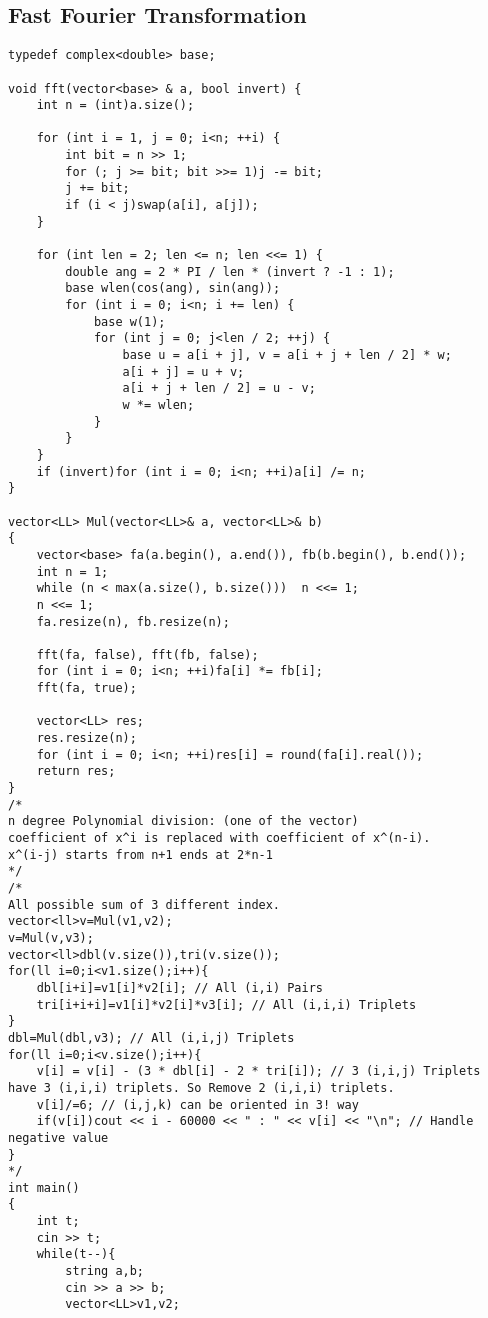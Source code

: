 \documentclass[10pt,a4paper,onesided]{article}
\begin{document}
\begin{multicols*}{3}
\subsection{Fast Fourier Transformation}
\begin{lstlisting}
typedef complex<double> base;

void fft(vector<base> & a, bool invert) {
    int n = (int)a.size();

    for (int i = 1, j = 0; i<n; ++i) {
        int bit = n >> 1;
        for (; j >= bit; bit >>= 1)j -= bit;
        j += bit;
        if (i < j)swap(a[i], a[j]);
    }

    for (int len = 2; len <= n; len <<= 1) {
        double ang = 2 * PI / len * (invert ? -1 : 1);
        base wlen(cos(ang), sin(ang));
        for (int i = 0; i<n; i += len) {
            base w(1);
            for (int j = 0; j<len / 2; ++j) {
                base u = a[i + j], v = a[i + j + len / 2] * w;
                a[i + j] = u + v;
                a[i + j + len / 2] = u - v;
                w *= wlen;
            }
        }
    }
    if (invert)for (int i = 0; i<n; ++i)a[i] /= n;
}

vector<LL> Mul(vector<LL>& a, vector<LL>& b)
{
    vector<base> fa(a.begin(), a.end()), fb(b.begin(), b.end());
    int n = 1;
    while (n < max(a.size(), b.size()))  n <<= 1;
    n <<= 1;
    fa.resize(n), fb.resize(n);

    fft(fa, false), fft(fb, false);
    for (int i = 0; i<n; ++i)fa[i] *= fb[i];
    fft(fa, true);

    vector<LL> res;
    res.resize(n);
    for (int i = 0; i<n; ++i)res[i] = round(fa[i].real());
    return res;
}
/*
n degree Polynomial division: (one of the vector)
coefficient of x^i is replaced with coefficient of x^(n-i).
x^(i-j) starts from n+1 ends at 2*n-1
*/
/*
All possible sum of 3 different index.
vector<ll>v=Mul(v1,v2);
v=Mul(v,v3);
vector<ll>dbl(v.size()),tri(v.size());
for(ll i=0;i<v1.size();i++){
    dbl[i+i]=v1[i]*v2[i]; // All (i,i) Pairs
    tri[i+i+i]=v1[i]*v2[i]*v3[i]; // All (i,i,i) Triplets
}
dbl=Mul(dbl,v3); // All (i,i,j) Triplets
for(ll i=0;i<v.size();i++){
    v[i] = v[i] - (3 * dbl[i] - 2 * tri[i]); // 3 (i,i,j) Triplets have 3 (i,i,i) triplets. So Remove 2 (i,i,i) triplets.
    v[i]/=6; // (i,j,k) can be oriented in 3! way
    if(v[i])cout << i - 60000 << " : " << v[i] << "\n"; // Handle negative value
}
*/
int main()
{
    int t;
    cin >> t;
    while(t--){
        string a,b;
        cin >> a >> b;
        vector<LL>v1,v2;


\end{lstlisting}
\end{multicols*}
\end{document}
